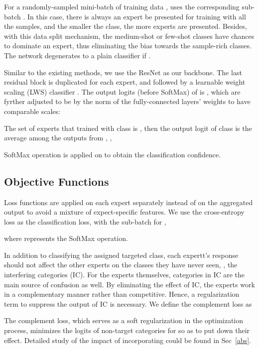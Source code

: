 \documentclass[10pt,twocolumn,letterpaper]{article}
\begin{document}
For a randomly-sampled mini-batch of training data ,  uses the corresponding sub-batch . In this case, there is always an expert be presented for training with all the samples, and the smaller the class, the more experts are presented. Besides, with this data split mechanism, the medium-shot or few-shot classes have chances to dominate an expert, thus eliminating the bias towards the sample-rich classes. The network degenerates to a plain classifier if . 

Similar to the existing methods, we use the ResNet \cite{he2016deep} as our backbone. The last residual block is duplicated for each expert, and followed by a learnable weight scaling (LWS) classifier \cite{kang2019decoupling}. The output logits (before SoftMax) of  is , which are fyrther adjusted to be  by the norm of the fully-connected layers' weights to have comparable scales: 


The set of experts that trained with class  is , then the output logit of class  is the average among the outputs from , \ie, 


SoftMax operation is applied on  to obtain the classification confidence.

\subsection{Objective Functions}
Loss functions are applied on each expert separately instead of on the aggregated output  to avoid a mixture of expect-specific features. We use the cross-entropy loss as the classification loss, with the sub-batch  for ,

where  represents the SoftMax operation.

In addition to classifying the assigned targeted class, each expertt’s response should not affect the other experts on the classes they have never seen, \ie, the interfering categories (IC). For the experts themselves, categories in IC are the main source of confusion as well. By eliminating the effect of IC, the experts work in a complementary manner rather than competitive. Hence, a regularization term to suppress the output of IC is necessary. We define the complement loss  as



The complement loss, which serves as a soft regularization in the optimization process, minimizes the logits of non-target categories for  so as to put down their effect. Detailed study of the impact of incorporating  could be found in Sec~\ref{abs}.
\end{document}
